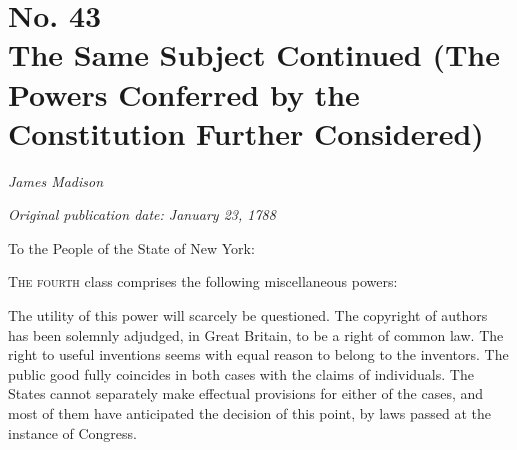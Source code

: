 \chapter[No. 43: The Same Subject Continued (The Powers Conferred by the Constitution Further Considered)]{No. 43\\ {\small The Same Subject Continued (The Powers Conferred by the Constitution Further Considered)}}

\textit{James Madison}

\textit{Original publication date: January 23, 1788}
\vspace{1cm}

To the People of the State of New York:
\vspace{.4cm}

\textsc{The fourth} class comprises the following miscellaneous powers:

The utility of this power will scarcely be questioned. 
The copyright of authors has been solemnly adjudged, in Great Britain, to be a right of common law. 
The right to useful inventions seems with equal reason to belong to the inventors. 
The public good fully coincides in both cases with the claims of individuals. 
The States cannot separately make effectual provisions for either of the cases, and most of them have anticipated the decision of this point, by laws passed at the instance of Congress.

